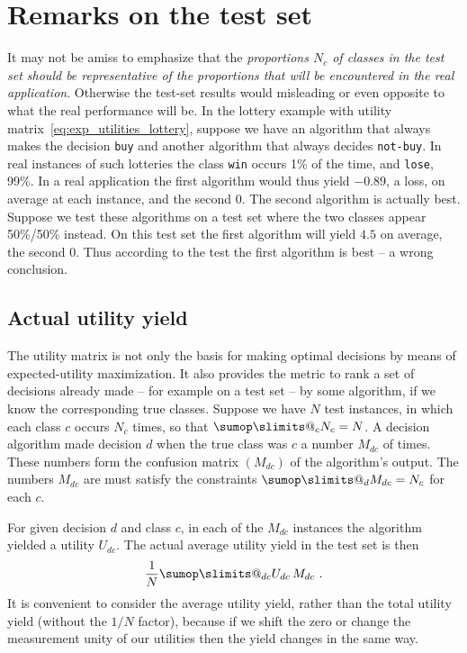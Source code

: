 \documentclass[\ifafour a4paper,12pt,\else a5paper,10pt,\fi%
onecolumn,oneside,article,%
british%
]{memoir}
\makeatletter
\theoremstyle{remark}
\theoremstyle{innote}
\def\sum{\DOTSI\sumop\slimits@}
\renewcommand*{\|}[1][]{\nonscript\:#1\vert\nonscript\:\mathopen{}}
\makeatother
\begin{document}
\section{Remarks on the test set}
\label{sec:test_set}


It may not be amiss to emphasize that the \emph{proportions $N_{c}$ of classes in the test set should be representative of the proportions that will be encountered in the real application}. Otherwise the test-set results would misleading or even opposite to what the real performance will be. In the lottery example with utility matrix~\eqref{eq:exp_utilities_lottery}, suppose we have an algorithm that always makes the decision \texttt{buy} and another algorithm that always decides \texttt{not-buy}. In  real instances of such lotteries the class \texttt{win} occurs 1\% of the time, and \texttt{lose}, 99\%. In a real application the first algorithm would thus yield $-0.89$, a loss, on average at each instance, and the second $0$. The second algorithm is actually best. Suppose we test these algorithms on a test set where the two classes appear 50\%/50\% instead. On this test set the first algorithm will yield $4.5$ on average, the second $0$. Thus according to the test the first algorithm is best -- a wrong conclusion.




\subsection{Actual utility yield}
\label{sec:dt_utility_yield}

The utility matrix is not only the basis for making optimal decisions by means of expected-utility maximization. It also provides the metric to rank a set of decisions already made -- for example on a test set -- by some algorithm, if we know the corresponding true classes. Suppose we have $N$ test instances, in which each class $c$ occurs $N_{c}$ times, so that $\sum_{c} N_{c} = N$. A decision algorithm made decision $d$ when the true class was $c$ a number $M_{dc}$ of times. These numbers form the confusion matrix $(M_{dc})$ of the algorithm's output. The numbers $M_{dc}$ are must satisfy the constraints $\sum_{d} M_{dc} = N_{c}$ for each $c$.

For given decision $d$ and class $c$, in each of the $M_{dc}$ instances the algorithm yielded a utility $U_{dc}$. The actual average utility yield in the test set is then
\begin{equation}
  \label{eq:utility_gained}
 \frac{1}{N} \sum_{dc} U_{dc}\, M_{dc} \ .
\end{equation}
It is convenient to consider the average utility yield, rather than the total utility yield (without the $1/N$ factor), because if we shift the zero or change the measurement unity of our utilities then the yield changes in the same way.
\end{document}
